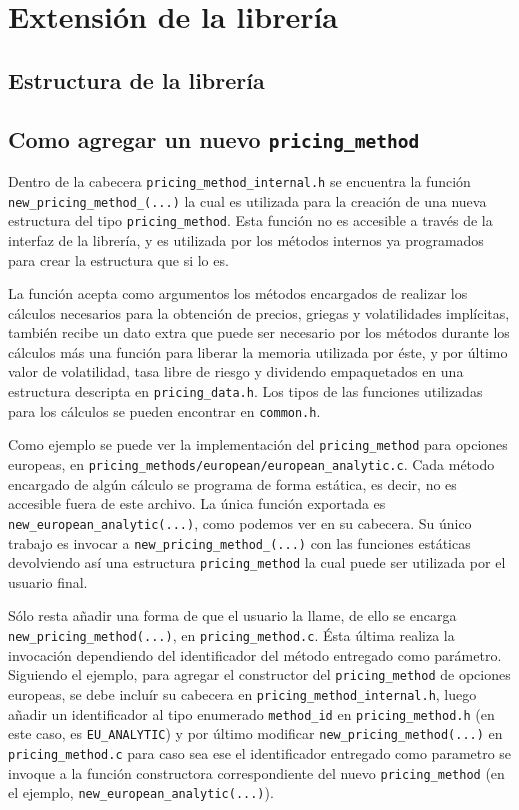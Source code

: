\documentclass[12pt,a4paper,final]{article}
\begin{document}
\section{Extensión de la librería}
	\subsection{Estructura de la librería}
		
	\subsection{Como agregar un nuevo \texttt{pricing\_method}}
		Dentro de la cabecera \texttt{pricing\_method\_internal.h} se encuentra 
		la función \texttt{new\_pricing\_method\_(...)} la cual es utilizada
		para la creación de una nueva estructura del tipo \texttt{pricing\_method}.
		Esta función no es accesible a través de la interfaz de la librería, y es utilizada 
		por los métodos internos ya programados para crear la estructura que si lo es.
		
		La función acepta como argumentos los métodos encargados de realizar los cálculos
		necesarios para la obtención de precios, griegas y volatilidades implícitas, también recibe un dato
		extra que puede ser necesario por los métodos durante los cálculos más una función para liberar
		la memoria utilizada por éste, y por último valor de volatilidad, tasa libre de riesgo y dividendo
		empaquetados en una estructura descripta en \texttt{pricing\_data.h}. Los tipos de las funciones
		utilizadas para los cálculos se pueden encontrar en \texttt{common.h}.
				
		Como ejemplo se puede ver la implementación del \texttt{pricing\_method} para opciones europeas,
		en \texttt{pricing\_methods/european/european\_analytic.c}. Cada método encargado de algún cálculo
		se programa de forma estática, es decir, no es accesible fuera de este archivo. La única
		función exportada es \texttt{new\_european\_analytic(...)}, como podemos ver en su cabecera.
		Su único trabajo es invocar a \texttt{new\_pricing\_method\_(...)} con las funciones estáticas
		devolviendo así una estructura \texttt{pricing\_method} la cual puede ser utilizada por el usuario final.
		
		Sólo resta añadir una forma de que el usuario la llame, de ello se encarga \texttt{new\_pricing\_method(...)},
		en \texttt{pricing\_method.c}. Ésta última realiza la invocación dependiendo del identificador del método
		entregado como parámetro. Siguiendo el ejemplo, para agregar el constructor del \texttt{pricing\_method} de
		opciones europeas, se debe incluír su cabecera en \texttt{pricing\_method\_internal.h}, luego
		añadir un identificador al tipo enumerado \texttt{method\_id} en \texttt{pricing\_method.h} (en este caso,
		es \texttt{EU\_ANALYTIC}) y por último modificar \texttt{new\_pricing\_method(...)} 
		en \texttt{pricing\_method.c} para caso sea ese el identificador entregado como parametro se invoque a
		la función constructora correspondiente del nuevo \texttt{pricing\_method} (en el ejemplo, 
		\texttt{new\_european\_analytic(...)}). 
		
\end{document}
